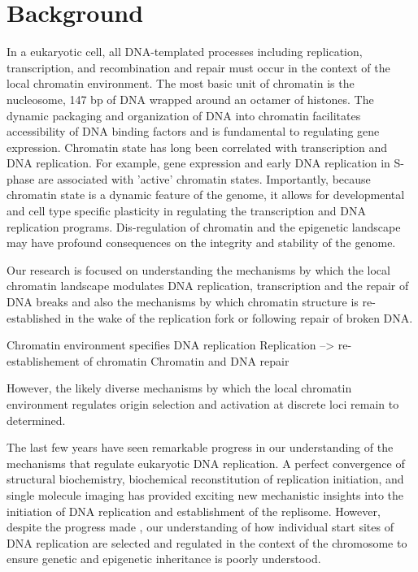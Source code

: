 \section{Background}


In a eukaryotic cell, all DNA-templated processes including replication, transcription, and recombination and repair must occur in the context of the local chromatin environment.  The most basic unit of chromatin is the nucleosome, 147 bp of DNA wrapped around an octamer of histones\citep{McGinty2015-kd}.  The dynamic packaging and organization of DNA into chromatin facilitates accessibility of DNA binding factors and is fundamental to regulating gene expression\citep{Kouzarides2007-sk}. Chromatin state has long been correlated with transcription and DNA replication\citep{Stambrook1970-jm,Goldman1984-im}.  For example, gene expression and early DNA replication in S-phase are associated with 'active' chromatin states\citep{Rhind2013-yr}. Importantly, because chromatin state is a dynamic feature of the genome, it allows for developmental and cell type specific plasticity in regulating the transcription and DNA replication programs\citep{Goren2008-wr}.  Dis-regulation of chromatin and the epigenetic landscape may have profound consequences on the integrity and stability of the genome.

Our research is focused on understanding the mechanisms by which the local chromatin landscape modulates DNA replication, transcription and the repair of DNA breaks and also the mechanisms by which chromatin structure is re-established in the wake of the replication fork or following repair of broken DNA.  







Chromatin environment specifies DNA replication
Replication --> re-establishement of chromatin
Chromatin and DNA repair 




However, the likely diverse mechanisms by which the local chromatin environment regulates origin selection and activation at discrete loci remain to determined.

The last few years have seen remarkable progress in our understanding of the mechanisms that regulate eukaryotic DNA replication.  A perfect convergence of structural biochemistry\citep{Bleichert2015-zl}, biochemical reconstitution of replication initiation\citep{Yeeles2015-pe}, and single molecule imaging\citep{Ticau2015-gg} has provided exciting new mechanistic insights into the initiation of DNA replication and establishment of the replisome.  However, despite the progress made \invitro, our understanding of how individual start sites of DNA replication are selected and regulated in the context of the chromosome to ensure genetic and epigenetic inheritance is poorly understood\citep{Prioleau2016-bj}. 





